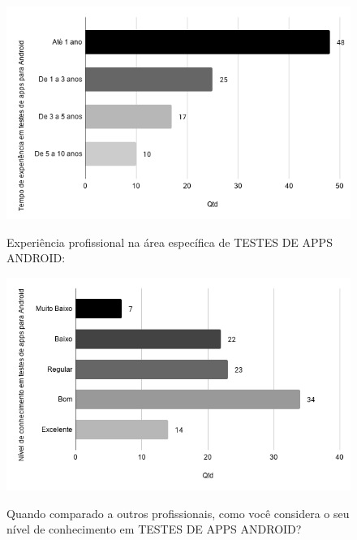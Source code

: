         \begin{figure}[!htb]
        \centering
        \includegraphics[width=.80\textwidth]{images/s_experienciatestesandroid.png}
        \label{figure:s_experienciatestesandroid}
        \caption{Experiência profissional na área específica de TESTES DE APPS ANDROID:}
        \end{figure}
    
    
        \begin{figure}[!htb]
        \centering
        \includegraphics[width=.80\textwidth]{images/s_conhecimentotestesandroid.png}
        \label{figure:s_conhecimentotestesandroid}
        \caption{Quando comparado a outros profissionais, como você considera o seu nível de conhecimento em TESTES DE APPS ANDROID?}
        \end{figure}   
    
    
    
